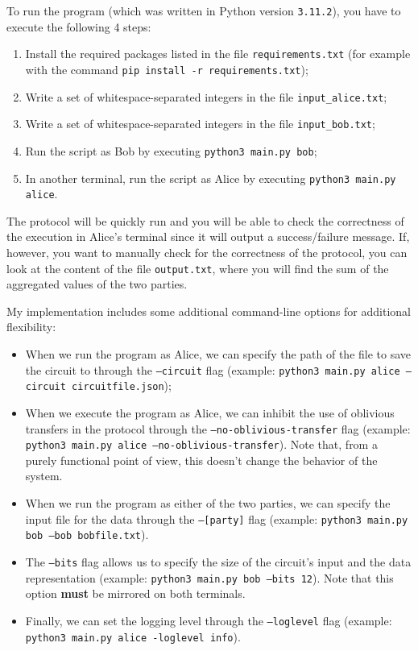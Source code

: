\documentclass[12pt]{article}
\begin{document}
To run the program (which was written in Python version \texttt{3.11.2}), you have to execute the following 4 steps:

\begin{enumerate}
  \item Install the required packages listed in the file \texttt{requirements.txt} (for example with the command \texttt{pip install -r requirements.txt});
  \item Write a set of whitespace-separated integers in the file \texttt{input\_alice.txt};
  \item Write a set of whitespace-separated integers in the file \texttt{input\_bob.txt};
  \item Run the script as Bob by executing \texttt{python3 main.py bob};
  \item In another terminal, run the script as Alice by executing \texttt{python3 main.py alice}.
\end{enumerate}

The protocol will be quickly run and you will be able to check the correctness of the execution in Alice's terminal since it will output a success/failure message. If, however, you want to manually check for the correctness of the protocol, you can look at the content of the file \texttt{output.txt}, where you will find the sum of the aggregated values of the two parties.

My implementation includes some additional command-line options for additional flexibility:

\begin{itemize}
  \item When we run the program as Alice, we can specify the path of the file to save the circuit to through the \texttt{--circuit} flag (example: \texttt{python3 main.py alice --circuit circuitfile.json});
  \item When we execute the program as Alice, we can inhibit the use of oblivious transfers in the protocol through the \texttt{--no-oblivious-transfer} flag (example: \texttt{python3 main.py alice --no-oblivious-transfer}). Note that, from a purely functional point of view, this doesn't change the behavior of the system.
  \item When we run the program as either of the two parties, we can specify the input file for the data through the \texttt{--[party]} flag (example: \texttt{python3 main.py bob --bob bobfile.txt}).
  \item The \texttt{--bits} flag allows us to specify the size of the circuit's input and the data representation (example: \texttt{python3 main.py bob --bits 12}). Note that this option \textbf{must} be mirrored on both terminals.
  \item Finally, we can set the logging level through the \texttt{--loglevel} flag (example: \texttt{python3 main.py alice -loglevel info}).
\end{itemize}
\end{document}
